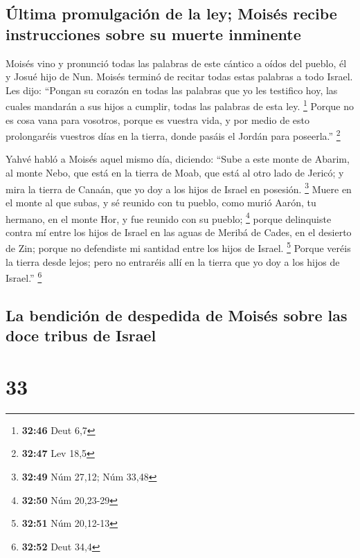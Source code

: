 \hypertarget{uxfaltima-promulgaciuxf3n-de-la-ley-moisuxe9s-recibe-instrucciones-sobre-su-muerte-inminente}{%
\subsection{Última promulgación de la ley; Moisés recibe instrucciones
sobre su muerte
inminente}\label{uxfaltima-promulgaciuxf3n-de-la-ley-moisuxe9s-recibe-instrucciones-sobre-su-muerte-inminente}}

 Moisés vino y pronunció todas las palabras de este
cántico a oídos del pueblo, él y Josué hijo de Nun. 
Moisés terminó de recitar todas estas palabras a todo Israel.
 Les dijo: ``Pongan su corazón en todas las palabras que
yo les testifico hoy, las cuales mandarán a sus hijos a cumplir, todas
las palabras de esta ley. \footnote{\textbf{32:46} Deut 6,7}
 Porque no es cosa vana para vosotros, porque es vuestra
vida, y por medio de esto prolongaréis vuestros días en la tierra, donde
pasáis el Jordán para poseerla.'' \footnote{\textbf{32:47} Lev 18,5}

 Yahvé habló a Moisés aquel mismo día, diciendo:
 ``Sube a este monte de Abarim, al monte Nebo, que está
en la tierra de Moab, que está al otro lado de Jericó; y mira la tierra
de Canaán, que yo doy a los hijos de Israel en posesión. \footnote{\textbf{32:49}
  Núm 27,12; Núm 33,48}  Muere en el monte al que subas,
y sé reunido con tu pueblo, como murió Aarón, tu hermano, en el monte
Hor, y fue reunido con su pueblo; \footnote{\textbf{32:50} Núm 20,23-29}
 porque delinquiste contra mí entre los hijos de Israel
en las aguas de Meribá de Cades, en el desierto de Zin; porque no
defendiste mi santidad entre los hijos de Israel. \footnote{\textbf{32:51}
  Núm 20,12-13}  Porque veréis la tierra desde lejos;
pero no entraréis allí en la tierra que yo doy a los hijos de Israel.''
\footnote{\textbf{32:52} Deut 34,4}

\hypertarget{la-bendiciuxf3n-de-despedida-de-moisuxe9s-sobre-las-doce-tribus-de-israel}{%
\subsection{La bendición de despedida de Moisés sobre las doce tribus de
Israel}\label{la-bendiciuxf3n-de-despedida-de-moisuxe9s-sobre-las-doce-tribus-de-israel}}

\hypertarget{section-32}{%
\section{33}\label{section-32}}

